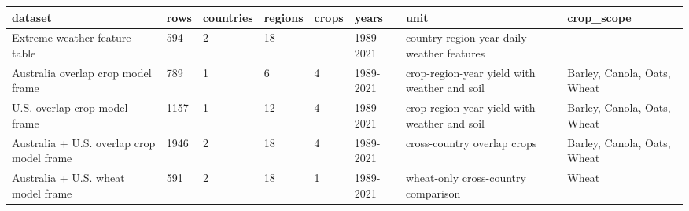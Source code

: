 \begin{tabular}{llllllll}
\hline
dataset & rows & countries & regions & crops & years & unit & crop\_scope \\
\hline
Extreme-weather feature table & 594 & 2 & 18 &  & 1989-2021 & country-region-year daily-weather features &  \\
Australia overlap crop model frame & 789 & 1 & 6 & 4 & 1989-2021 & crop-region-year yield with weather and soil & Barley, Canola, Oats, Wheat \\
U.S. overlap crop model frame & 1157 & 1 & 12 & 4 & 1989-2021 & crop-region-year yield with weather and soil & Barley, Canola, Oats, Wheat \\
Australia + U.S. overlap crop model frame & 1946 & 2 & 18 & 4 & 1989-2021 & cross-country overlap crops & Barley, Canola, Oats, Wheat \\
Australia + U.S. wheat model frame & 591 & 2 & 18 & 1 & 1989-2021 & wheat-only cross-country comparison & Wheat \\
\hline
\end{tabular}
